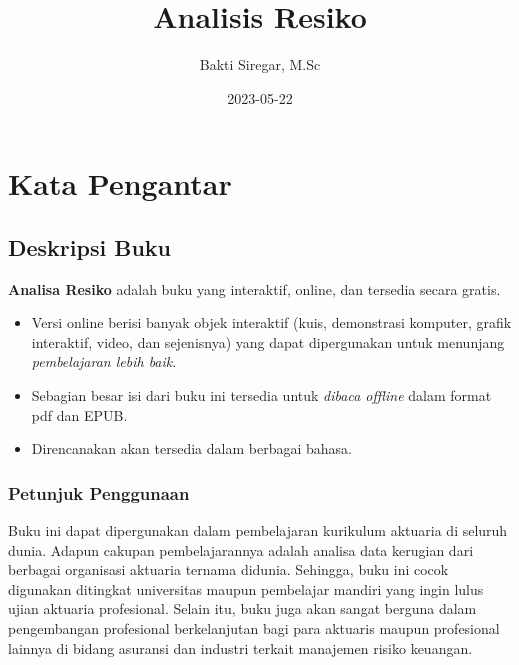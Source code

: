 \documentclass[
]{book}
\title{Analisis Resiko}
\author{Bakti Siregar, M.Sc}
\date{2023-05-22}
\providecommand{\tightlist}{%
  \setlength{\itemsep}{0pt}\setlength{\parskip}{0pt}}
\begin{document}
\maketitle

{
\setcounter{tocdepth}{1}
\tableofcontents
}
\hypertarget{kata-pengantar}{%
\chapter*{Kata Pengantar}\label{kata-pengantar}}

\hypertarget{deskripsi-buku}{%
\section*{Deskripsi Buku}\label{deskripsi-buku}}

\textbf{Analisa Resiko} adalah buku yang interaktif, online, dan tersedia secara gratis.

\begin{itemize}
\tightlist
\item
  Versi online berisi banyak objek interaktif (kuis, demonstrasi komputer, grafik interaktif, video, dan sejenisnya) yang dapat dipergunakan untuk menunjang \emph{pembelajaran lebih baik}.
\item
  Sebagian besar isi dari buku ini tersedia untuk \emph{dibaca offline} dalam format pdf dan EPUB.
\item
  Direncanakan akan tersedia dalam berbagai bahasa.
\end{itemize}

\hypertarget{petunjuk-penggunaan}{%
\subsection*{Petunjuk Penggunaan}\label{petunjuk-penggunaan}}

Buku ini dapat dipergunakan dalam pembelajaran kurikulum aktuaria di seluruh dunia. Adapun cakupan pembelajarannya adalah analisa data kerugian dari berbagai organisasi aktuaria ternama didunia. Sehingga, buku ini cocok digunakan ditingkat universitas maupun pembelajar mandiri yang ingin lulus ujian aktuaria profesional. Selain itu, buku juga akan sangat berguna dalam pengembangan profesional berkelanjutan bagi para aktuaris maupun profesional lainnya di bidang asuransi dan industri terkait manajemen risiko keuangan.
\end{document}
